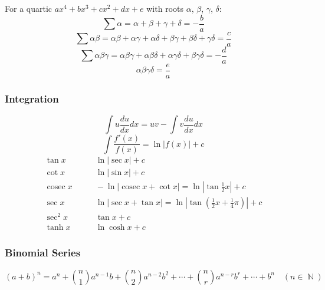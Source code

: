 \documentclass{book}
\DeclareMathOperator{\cosec}{cosec}
\DeclareMathOperator{\N}{\mathbb{N}}
\begin{document}
                For a quartic $ax^4+bx^3+cx^2+dx+e$ with \glspl{root} $\alpha$, $\beta$, $\gamma$, $\delta$:
                \begin{equation}
                    \sum\alpha=\alpha+\beta+\gamma+\delta=-\frac{b}{a}
                \end{equation}
                \begin{equation}
                    \sum\alpha\beta=\alpha\beta+\alpha\gamma+\alpha\delta+\beta\gamma+\beta\delta+\gamma\delta=\frac{c}{a}
                \end{equation}
                \begin{equation}
                    \sum\alpha\beta\gamma=\alpha\beta\gamma+\alpha\beta\delta+\alpha\gamma\delta+\beta\gamma\delta=-\frac{d}{a}
                \end{equation}
                \begin{equation}
                    \alpha\beta\gamma\delta=\frac{e}{a}
                \end{equation}


                \subsubsection{{Integration}}
                \begin{equation}
                    \int u\frac{du}{dx}dx=uv-\int v\frac{du}{dx}dx
                \end{equation}
                \begin{equation}
                    \int \frac{f'(x)}{f(x)}=\ln|f(x)|+c
                \end{equation}
                \begin{align}
                    \tan x&\qquad\ln|\sec x|+c \\
                    \cot x&\qquad\ln|\sin x|+c \\
                    \cosec x&\qquad-\ln|\cosec x+\cot x|=\ln\left|\tan \frac{1}{2}x\right|+c \\
                    \sec x&\qquad\ln|\sec x+\tan x|=\ln\left|\tan\left(\frac{1}{2}x+\frac{1}{4}\pi\right)\right|+c \\
                    \sec^2x&\qquad\tan x+c \\
                    \tanh x&\qquad\ln\cosh x+c
                \end{align}

            \subsubsection{Binomial Series}
                \begin{equation}
                    (a+b)^n=a^n+\binom{n}{1}a^{n-1}b+\binom{n}{2}a^{n-2}b^2+\cdots+\binom{n}{r}a^{n-r}b^r+\cdots+b^n\quad(n\in\N)
                \end{equation}
\end{document}
